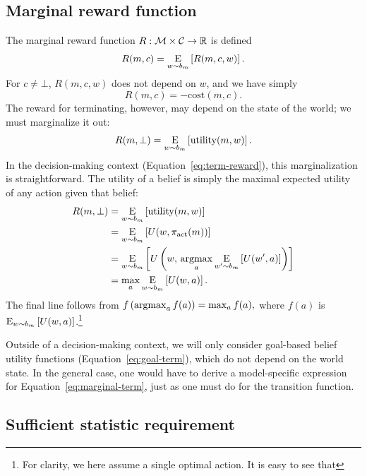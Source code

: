 \subsection{Marginal reward function}
The marginal reward function $R: \M \times \C \rightarrow \R$ is defined
%
\begin{equation}
R(m, c) = \expectunder{R(m, c, w)}{w \sim b_m}.
\end{equation}
%
For $c \neq \bot$, $R(m, c, w)$ does not depend on $w$, and we have simply
%
\begin{equation}
  R(m, c) = -\text{cost}(m, c).
\end{equation}
The reward for terminating, however, may depend on the state of the world; we must marginalize it out:
%
\begin{equation}\label{eq:marginal-term}
  R(m, \bot) = \expectunder{\utility(m, w)}{w \sim b_m}.
\end{equation}
%
In the decision-making context (Equation~\ref{eq:term-reward}), this marginalization is straightforward. The utility of a belief is simply the maximal expected utility of any action given that belief:
%
\begin{equation}
\begin{aligned}
R(m, \bot)
&= \expectunder{\utility(m, w)}{w \sim b_m} \\
&= \expectunder{U(w, \pi\act(m))}{w \sim b_m} \\
&= \expectunder{U\left(w,\, \argmax_a \expectunder{U(w', a)}{w' \sim b_m}\right)}{w \sim b_m} \\
&= \max_a \expectunder{U(w, a)}{w \sim b_m}
.
\end{aligned}
\end{equation}
The final line follows from
%
\begin{math}
  f\left(\argmax_a f(a)\right) = \max_a f(a)
  ,
\end{math}
%
where $f(a)$ is $\expectunder{U(w, a)}{w \sim b_m}$.\footnote{%
  For clarity, we here assume a single optimal action. It is easy to see that 
}

Outside of a decision-making context, we will only consider goal-based belief utility functions (Equation~\ref{eq:goal-term}), which do not depend on the world state. In the general case, one would have to derive a model-specific expression for Equation~\ref{eq:marginal-term}, just as one must do for the transition function.

\subsection{Sufficient statistic requirement}\label{sec:metamdp-sufficient}

